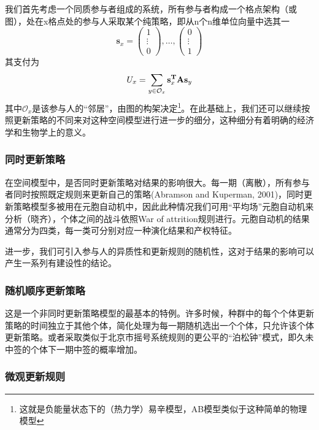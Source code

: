 \documentclass[lang=cn,12pt,a4paper]{elegantpaper}
\begin{document}
我们首先考虑一个同质参与者组成的系统，所有参与者构成一个格点架构（或图），处在x格点处的参与人采取某个纯策略，即从n个n维单位向量中选其一
\begin{equation}
\mathbf{s}_{x}=\left(\begin{array}{c}
1 \\
\vdots \\
0
\end{array}\right), \ldots,\left(\begin{array}{c}
0 \\
\vdots \\
1
\end{array}\right)
\end{equation}
其支付为
\begin{equation}
U_{x}=\sum_{y \in\mathcal{O}_{x}} \mathbf{s}_{x} ^{\bf{T}} \mathbf{A} \mathbf{s}_{y}
\end{equation}
其中$\mathcal{O}_x$是该参与人的“邻居”，由图的构架决定\footnote{这就是负能量状态下的（热力学）易辛模型，AB模型类似于这种简单的物理模型}。在此基础上，我们还可以继续按照更新策略的不同来对这种空间模型进行进一步的细分，这种细分有着明确的经济学和生物学上的意义。

\subsubsection{同时更新策略}

在空间模型中，是否同时更新策略对结果的影响很大。每一期（离散），所有参与者同时按照既定规则来更新自己的策略(Abramson and Kuperman, 2001)，同时更新策略模型多被用在元胞自动机中，因此此种情况我们可用“平均场”元胞自动机来分析（晓齐），个体之间的战斗依照War of attrition规则进行。元胞自动机的结果通常分为四类，每一类可分别对应一种演化结果和产权特征。

进一步，我们可引入参与人的异质性和更新规则的随机性，这对于结果的影响可以产生一系列有建设性的结论。

\subsubsection{随机顺序更新策略}

这是一个非同时更新策略模型的最基本的特例。许多时候，种群中的每个个体更新策略的时间独立于其他个体，简化处理为每一期随机选出一个个体，只允许该个体更新策略。或者采取类似于北京市摇号系统规则的更公平的“泊松钟”模式，即久未中签的个体下一期中签的概率增加。

\subsubsection{微观更新规则}
\end{document}
